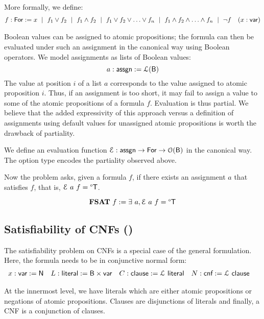 \documentclass[a4paper,UKenglish,cleveref, autoref]{lipics-v2019}
\begin{document}
More formally, we define: 
\begin{align*}
  f : \textsf{For} := x ~\mid~ f_1 \lor f_2 ~\mid~ f_1 \land f_2 ~\mid~ f_1 \lor f_2 \lor \ldots \lor f_n ~\mid~ f_1 \land f_2 \land \ldots \land f_n ~\mid~ \lnot f \quad (x : \textsf{var})
\end{align*}

Boolean values can be assigned to atomic propositions; the formula can then be evaluated under such an assignment in the canonical way using Boolean operators. 
We model assignments as lists of Boolean values:
\[ a : \textsf{assgn} := \mathcal{L} (\textsf{B})\]
The value at position $i$ of a list $a$ corresponds to the value assigned to atomic proposition $i$. Thus, if an assignment is too short, it may fail to assign a value to some of the atomic propositions of a formula $f$. Evaluation is thus partial.
We believe that the added expressivity of this approach versus a definition of assignments using default values for unassigned atomic propositions is worth the drawback of partiality.

We define an evaluation function $\mathcal{E} : \textsf{assgn} \rightarrow \textsf{For} \rightarrow \mathcal{O}{(\textsf{B})}$ in the canonical way. The option type encodes the partiality observed above. 

Now the problem \csat{} asks, given a formula $f$, if there exists an assignment $a$ that satisfies $f$, that is, $\mathcal{E}~a~f = \degree\mathsf{T}$. 
\begin{definition}
  \[\textbf{FSAT}{}~f := \exists~a, \mathcal{E}~a~f = \degree\mathsf{T}  \]
\end{definition}

\subsection{Satisfiability of CNFs (\sat{})}

The satisfiability problem on CNFs is a special case of the general \csat{} formulation. Here, the formula needs to be in conjunctive normal form: 
\begin{align*}
  x : \textsf{var} := \mathsf{N} &&
  L : \textsf{literal} := \textsf{B} \times \textsf{var} &&
  C : \textsf{clause} := \mathcal{L}~ \textsf{literal} &&
  N : \textsf{cnf} := \mathcal{L}~ \textsf{clause} && 
\end{align*}

At the innermost level, we have literals which are either atomic propositions or negations of atomic propositions. Clauses are disjunctions of literals and finally, a CNF is a conjunction of clauses.
\end{document}
